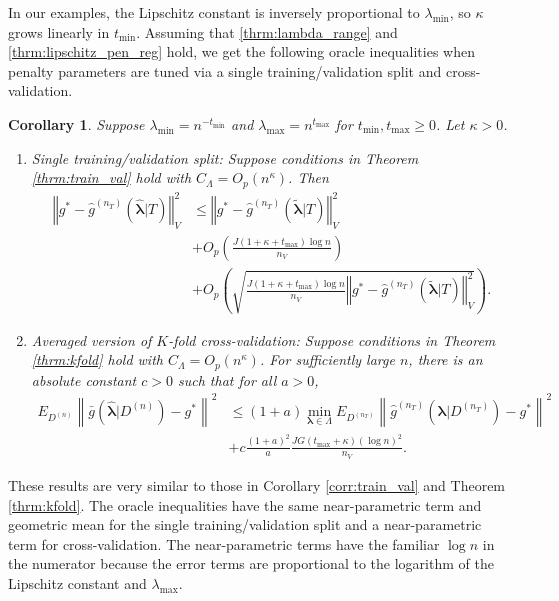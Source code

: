 \documentclass[12pt]{article} %
\newtheorem{corollary}{Corollary}
\theoremstyle{definition}
\begin{document}
In our examples, the Lipschitz constant is inversely proportional to $\lambda_{\min}$, so $\kappa$ grows linearly in $t_{\min}$. Assuming that \eqref{thrm:lambda_range} and \eqref{thrm:lipschitz_pen_reg} hold, we get the following oracle inequalities when penalty parameters are tuned via a single training/validation split and cross-validation. 
\begin{corollary}
	\label{corr:penalized_reg}
	Suppose $\lambda_{\min} = n^{-t_{\min}}$ and $\lambda_{\max} = n^{t_{\max}}$ for $t_{\min}, t_{\max} \ge 0$. Let $\kappa  > 0$.
	
	\begin{enumerate}
		\item Single training/validation split: Suppose conditions in Theorem \ref{thrm:train_val} hold with $C_\Lambda = O_p (n^\kappa)$. Then
		\begin{align*}
		\left\Vert g^* - \hat{g}^{(n_T)}( \hat{\boldsymbol{\lambda}} | T) \right\Vert _{V}^2
		&\le \left\Vert g^* - \hat{g}^{(n_T)}( \tilde{\boldsymbol{\lambda}} | T) \right \Vert^2_{V}\\
		& + O_p \left(\frac{J (1 + \kappa + t_{\max})\log n}{n_{V}} \right) 
		\\
		& + O_p \left(
		\sqrt{
			\frac{J (1 + \kappa + t_{\max})\log n}{n_{V}}
			\left\Vert g^* - \hat{g}^{(n_T)}( \tilde{\boldsymbol{\lambda}}| T) \right \Vert^2_{V}
		}
		\right ).
		\end{align*}
		
		\item Averaged version of $K$-fold cross-validation: Suppose conditions in Theorem \ref{thrm:kfold}  hold with $C_\Lambda = O_p(n^\kappa)$. For sufficiently large $n$, there is an absolute constant $c > 0$ such that for all $a > 0$,
		\begin{align*}
			E_{D^{(n)}} \left \| \bar{g} ( \hat{\boldsymbol \lambda} | {D^{(n)}} ) - g^* \right \|^2 &\le
			(1+a) \min_{\boldsymbol{\lambda} \in \Lambda}  E_{D^{(n_T)}} \left \| \hat{g}^{(n_T)}(\boldsymbol \lambda | D^{(n_T)}) - g^* \right \|^2 \\
			& + c \frac{(1+a)^2}{a} 
			\frac{JG (t_{\max} + \kappa) (\log n)^2 }{n_V}. 
		\end{align*}
	\end{enumerate}
\end{corollary}
These results are very similar to those in Corollary \ref{corr:train_val} and Theorem \ref{thrm:kfold}. The oracle inequalities have the same near-parametric term and geometric mean for the single training/validation split and a near-parametric term for cross-validation. The near-parametric terms have the familiar $\log n$ in the numerator because the error terms are proportional to the logarithm of the Lipschitz constant and $\lambda_{\max}$. 
\end{document}
